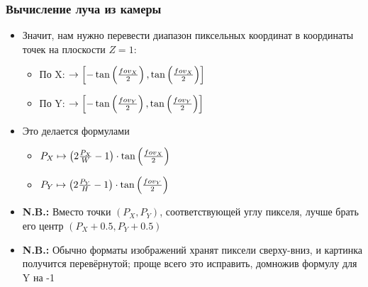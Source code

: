 \documentclass[10pt]{beamer}
\begin{document}
\begin{frame}
\frametitle{Вычисление луча из камеры}
\begin{itemize}
\item Значит, нам нужно перевести диапазон пиксельных координат в координаты точек на плоскости \begin{math}Z=1\end{math}:
\begin{itemize}
\item По X: \begin{math}[0, W]\rightarrow\left[-\tan\left({fov_X\over 2}\right), \tan\left({fov_X\over 2}\right)\right]\end{math}
\item По Y: \begin{math}[0, H]\rightarrow\left[-\tan\left({fov_Y\over 2}\right), \tan\left({fov_Y\over 2}\right)\right]\end{math}
\end{itemize}
\pause
\item Это делается формулами
\begin{itemize}
\item \begin{math}P_X \mapsto \left(2 \frac{P_X}{W} - 1\right) \cdot \tan\left({fov_X\over 2}\right)\end{math}
\item \begin{math}P_Y \mapsto \left(2 \frac{P_Y}{H} - 1\right) \cdot \tan\left({fov_Y\over 2}\right)\end{math}
\end{itemize}
\pause
\item \alert{\textbf{N.B.:}} Вместо точки \begin{math}(P_X, P_Y)\end{math}, соответствующей углу пикселя, лучше брать его центр \begin{math}(P_X + 0.5, P_Y + 0.5)\end{math}
\item \alert{\textbf{N.B.:}} Обычно форматы изображений хранят пиксели сверху-вниз, и картинка получится перевёрнутой; проще всего это исправить, домножив формулу для Y на -1
\end{itemize}
\end{frame}
\end{document}
